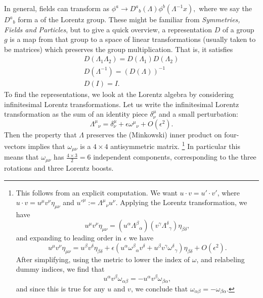 In general, fields can transform as $\phi^a \to {D^a}_b(\Lambda) \phi^b(\Lambda^{-1}x),$ where we say the ${D^a}_b$ form a  of the Lorentz group. These might be familiar from \emph{Symmetries, Fields and Particles}, but to give a quick overview, a representation $D$ of a group $g$ is a map from that group to a space of linear transformations (usually taken to be matrices) which preserves the group multiplication. That is, it satisfies
\begin{gather*}
    D(\Lambda_1\Lambda_2)=D(\Lambda_1)D(\Lambda_2)\\
    D(\Lambda^{-1})=(D(\Lambda))^{-1}\\
    D(I)= I.
\end{gather*}
To find the representations, we look at the Lorentz algebra by considering infinitesimal Lorentz transformations. Let us write the infinitesimal Lorentz transformation as the sum of an identity piece $\delta^\mu_\nu$ and a small perturbation:
\begin{equation}
    {\Lambda^\mu}_\nu = \delta^\mu_\nu+\epsilon {\omega^\mu}_\nu + O(\epsilon^2).
\end{equation}
Then the property that $\Lambda$ preserves the (Minkowski) inner product on four-vectors implies that $\omega_{\mu\nu}$ is a $4\times 4$ antisymmetric matrix.%
    \footnote{This follows from an explicit computation. We want $u\cdot v = u' \cdot v'$, where $u\cdot v = u^\mu v^\nu \eta_{\mu\nu}$ and $u'^\mu := \Lambda^\mu{}_\nu u^\nu$. Applying the Lorentz transformation, we have
    \begin{equation*}
        u^\mu v^\nu \eta_{\mu\nu} = (u^\alpha \Lambda^\beta{}_\alpha) (v^\gamma \Lambda^\delta{}_\gamma) \eta_{\beta\delta},
    \end{equation*}
    and expanding to leading order in $\epsilon$ we have
    \begin{equation*}
        u^\mu v^\nu \eta_{\mu\nu} = u^\beta v^\delta \eta_{\beta\delta} + \epsilon (u^\alpha \omega^\beta{}_\alpha v^\delta + u^\beta v^\gamma \omega^\delta{}_\gamma)\eta_{\beta \delta} + O(\epsilon^2).
    \end{equation*}
    After simplifying, using the metric to lower the index of $\omega$, and relabeling dummy indices, we find that
    \begin{equation*}
        u^\alpha v^\beta \omega_{\alpha\beta} = - u^\alpha v^\beta \omega_{\beta \alpha},
    \end{equation*}
    and since this is true for any $u$ and $v$, we conclude that $\omega_{\alpha\beta} = -\omega_{\beta\alpha}$.
    }
In particular this means that $\omega_{\mu\nu}$ has $\frac{4\times 3}{2}=6$ independent components, corresponding to the three rotations and three Lorentz boosts.

